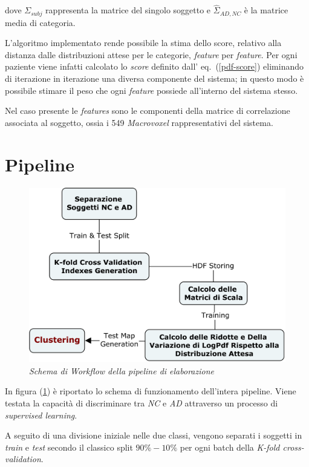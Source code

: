 \documentclass[12pt,openright,a4paper]{article}
\begin{document}
dove $\Sigma_{subj}$ rappresenta la matrice del singolo soggetto e $\hat{\Sigma}_{AD,NC}$ è la matrice media di categoria.

L'algoritmo implementato rende possibile la stima dello score, relativo alla distanza dalle distribuzioni attese per le categorie, \textit{feature} per \textit{feature}. Per ogni paziente viene infatti calcolato lo \textit{score} definito dall' eq.~(\ref{pdf-score}) eliminando di iterazione in iterazione una diversa componente del sistema; in questo modo è possibile stimare il peso che ogni \textit{feature} possiede all'interno del sistema stesso.

Nel caso presente le \textit{features} sono le componenti  della matrice di correlazione associata al soggetto, ossia i 549 \textit{Macrovoxel} rappresentativi del sistema.

\section{Pipeline}

\begin{figure}[!h]
\centering
\includegraphics[scale=0.18]{ADNI-alg}
\caption{\textit{Schema di Workflow della pipeline di elaborazione}}
\label{ADNI-alg}
\end{figure}

In figura (\ref{ADNI-alg}) è riportato lo schema di funzionamento dell'intera pipeline. Viene testata la capacità di discriminare tra \textit{NC} e \textit{AD} attraverso un processo di \textit{supervised learning}.

A seguito di una divisione iniziale nelle due classi, vengono separati i soggetti in \textit{train} e \textit{test} secondo il classico split $90 \%- 10 \%$ per ogni batch della \textit{K-fold cross-validation}.
\end{document}
